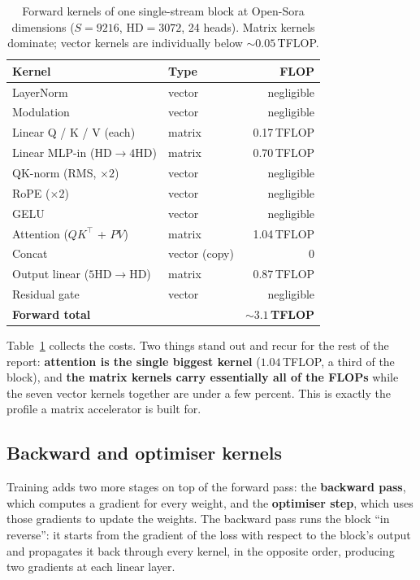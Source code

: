 \documentclass[11pt]{report}
\begin{document}
\begin{table}[t]
\centering
\caption{Forward kernels of one single-stream block at Open-Sora
dimensions ($S{=}9216$, $\mathrm{HD}{=}3072$, 24 heads). Matrix kernels
dominate; vector kernels are individually below ${\sim}0.05$\,TFLOP.}
\label{tab:fwd-kernels}
\begin{tabular}{@{}llr@{}}
\toprule
Kernel & Type & FLOP \\
\midrule
LayerNorm & vector & negligible \\
Modulation & vector & negligible \\
Linear Q / K / V (each) & matrix & 0.17\,TFLOP \\
Linear MLP-in ($\mathrm{HD}\!\to\!4\mathrm{HD}$) & matrix & 0.70\,TFLOP \\
QK-norm (RMS, $\times 2$) & vector & negligible \\
RoPE ($\times 2$) & vector & negligible \\
GELU & vector & negligible \\
Attention ($QK^\top$ + $PV$) & matrix & 1.04\,TFLOP \\
Concat & vector (copy) & 0 \\
Output linear ($5\mathrm{HD}\!\to\!\mathrm{HD}$) & matrix & 0.87\,TFLOP \\
Residual gate & vector & negligible \\
\midrule
\textbf{Forward total} & & \textbf{${\sim}3.1$\,TFLOP} \\
\bottomrule
\end{tabular}
\end{table}

Table~\ref{tab:fwd-kernels} collects the costs. Two things stand out and
recur for the rest of the report: \textbf{attention is the single
biggest kernel} ($1.04$\,TFLOP, a third of the block), and \textbf{the
matrix kernels carry essentially all of the FLOPs} while the seven vector
kernels together are under a few percent. This is exactly the profile a
matrix accelerator is built for.

\subsection{Backward and optimiser kernels}
\label{sec:bwd-kernels}

Training adds two more stages on top of the forward pass: the
\textbf{backward pass}, which computes a gradient for every weight, and the
\textbf{optimiser step}, which uses those gradients to update the weights.
The backward pass runs the block ``in reverse'': it starts from the
gradient of the loss with respect to the block's output and propagates it
back through every kernel, in the opposite order, producing two gradients
at each linear layer.
\end{document}
